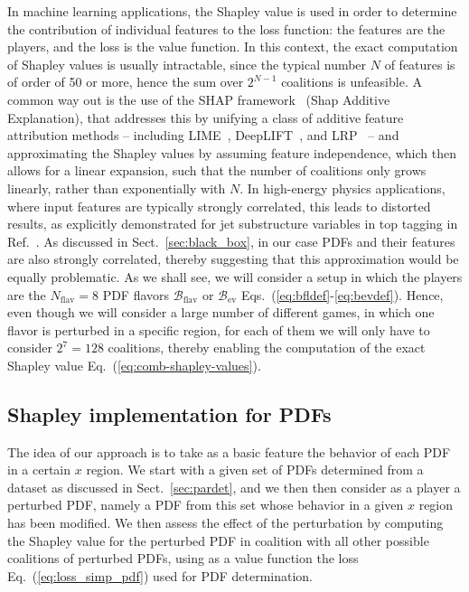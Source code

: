 \documentclass[11pt,a4paper]{article}
\begin{document}


In machine learning applications, the Shapley value is used in order to determine the contribution of individual features to the loss function: the features are the players, and the loss is the value  function. In this context,  the exact computation of Shapley values is usually intractable, since the typical number $N$ of features is of order of 50 or more, hence the sum over $2^{N-1}$ coalitions is unfeasible. A common way out is the use of the
SHAP framework~\cite{lundberg2017unifiedapproachinterpretingmodel} (Shap Additive Explanation), that addresses this by unifying a class of additive feature attribution 
methods -- including LIME~\cite{ribeiro2016whyitrustyou}, DeepLIFT~\cite{shrikumar2019learningimportantfeaturespropagating}, and LRP~\cite{binder2016layerwiserelevancepropagationneural} -- and 
approximating the Shapley values by assuming feature independence, which then allows for a linear expansion, such that the number of coalitions only grows linearly, rather than exponentially with $N$. In  high-energy physics applications, where input features are typically strongly correlated, this leads to distorted results, as explicitly demonstrated for jet substructure variables in top tagging in Ref.~\cite{Vent:2025ddm}. As discussed in Sect.~\ref{sec:black_box}, in our case PDFs and their features are also strongly correlated, thereby suggesting that this approximation would be equally problematic. As we shall see, we will consider a setup in which the players are the $N_\text{flav}=8$ PDF flavors  $\mathcal{B}_\text{flav}$ or $\mathcal{B}_\text{ev}$ Eqs.~(\ref{eq:bfldef}-\ref{eq:bevdef}). Hence, even though we will consider a large number of different games, in which one flavor is perturbed in a specific region, for each of them we will only have to consider $2^7=128$ coalitions, thereby enabling the computation of the exact Shapley value Eq.~(\ref{eq:comb-shapley-values}).

\subsection{Shapley implementation for PDFs}
\label{sec:setup}

The idea of our approach is to take as a basic feature the behavior of each PDF in a certain $x$ region.  We start with a given set of PDFs determined from a dataset as discussed in Sect.~\ref{sec:pardet}, and we then then consider as a player a perturbed PDF, namely a PDF from this set whose behavior in a given $x$ region has been modified. We then assess the effect of the perturbation by computing the Shapley value for the perturbed PDF in coalition with all other possible coalitions of perturbed PDFs, using as a value function the loss Eq.~(\ref{eq:loss_simp_pdf}) used for PDF determination. 
\end{document}
